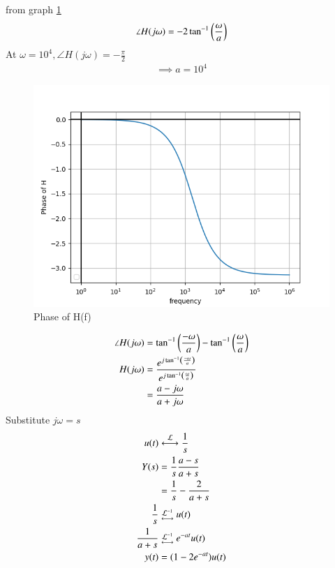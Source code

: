 \documentclass[journal,12pt,twocolumn]{IEEEtran}
\theoremstyle{remark}
\begin{document}
from graph \ref{Phase of H(f)}
\begin{align}
    \angle {H(j\omega)} = -2 \tan^{-1}\left(\frac{\omega}{a}\right)
\end{align}
At $\omega = 10^4, \angle{H(j\omega)} = -\frac{\pi}{2}$
\begin{align}
    \implies a = 10^4 
\end{align}
\begin{figure}[!h]
    \centering
    \includegraphics[width=\columnwidth]{figs/phase.png}
    \caption{Phase of H(f)}
    \label{Phase of H(f)}
\end{figure}
\begin{align}
    \angle {H(j\omega)} &= \tan^{-1}\left(\frac{-\omega}{a}\right) - \tan^{-1}\left(\frac{\omega}{a}\right)\\
    H(j\omega) &= \frac{e^{j\tan^{-1}\left(\frac{-\omega}{a}\right)}}{e^{j\tan^{-1}\left(\frac{\omega}{a}\right)}}\\
    &= \frac{a - j\omega}{a + j\omega}
\end{align}
Substitute $j\omega = s$
\begin{align}
    u(t) &\system{\mathcal{L}} \frac{1}{s}\\
    Y(s) &= \frac{1}{s} \frac{a - s}{a + s}\\
    &= \frac{1}{s} - \frac{2}{a + s}\\
    \frac{1}{s} &\mathrel{\substack{\mathcal{L}^{-1}\\\longleftrightarrow}} u(t)\\
    \frac{1}{a + s} &\mathrel{\substack{\mathcal{L}^{-1}\\\longleftrightarrow}} e^{-at} u(t) \\
    y(t) &= (1-2e^{-at}) u(t)
\end{align}
\end{document}
